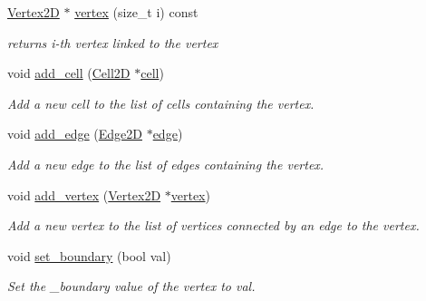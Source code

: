 \begin{DoxyCompactItemize}
\mbox{\label{classHCore2D_1_1Vertex2D_a2094c42a5fe6dc9fa3b91cb90746eeb9}} 
\hyperlink{classHCore2D_1_1Vertex2D}{Vertex2D} $\ast$ \hyperlink{classHCore2D_1_1Vertex2D_a2094c42a5fe6dc9fa3b91cb90746eeb9}{vertex} (size\+\_\+t i) const
\begin{DoxyCompactList}\small\item\em returns i-\/th vertex linked to the vertex \end{DoxyCompactList}\item 
\mbox{\label{classHCore2D_1_1Vertex2D_ae2b51139ae320115c0a732cb68dd5d91}} 
void \hyperlink{classHCore2D_1_1Vertex2D_ae2b51139ae320115c0a732cb68dd5d91}{add\+\_\+cell} (\hyperlink{classHCore2D_1_1Cell2D}{Cell2D} $\ast$\hyperlink{classHCore2D_1_1Vertex2D_ad5eb7914636eb9937f84370c6030aed9}{cell})
\begin{DoxyCompactList}\small\item\em Add a new cell to the list of cells containing the vertex. \end{DoxyCompactList}\item 
\mbox{\label{classHCore2D_1_1Vertex2D_a99d9e89fc5a01f960ca48179137dbd2f}} 
void \hyperlink{classHCore2D_1_1Vertex2D_a99d9e89fc5a01f960ca48179137dbd2f}{add\+\_\+edge} (\hyperlink{classHCore2D_1_1Edge2D}{Edge2D} $\ast$\hyperlink{classHCore2D_1_1Vertex2D_afebfae577ee499d5309ff6a3981279de}{edge})
\begin{DoxyCompactList}\small\item\em Add a new edge to the list of edges containing the vertex. \end{DoxyCompactList}\item 
\mbox{\label{classHCore2D_1_1Vertex2D_a44556af3aa22a09d2442fb87833085af}} 
void \hyperlink{classHCore2D_1_1Vertex2D_a44556af3aa22a09d2442fb87833085af}{add\+\_\+vertex} (\hyperlink{classHCore2D_1_1Vertex2D}{Vertex2D} $\ast$\hyperlink{classHCore2D_1_1Vertex2D_a2094c42a5fe6dc9fa3b91cb90746eeb9}{vertex})
\begin{DoxyCompactList}\small\item\em Add a new vertex to the list of vertices connected by an edge to the vertex. \end{DoxyCompactList}\item 
\mbox{\label{classHCore2D_1_1Vertex2D_a605706aa9e02bfc556a99c72eaf3e454}} 
void \hyperlink{classHCore2D_1_1Vertex2D_a605706aa9e02bfc556a99c72eaf3e454}{set\+\_\+boundary} (bool val)
\begin{DoxyCompactList}\small\item\em Set the \+\_\+boundary value of the vertex to val. \end{DoxyCompactList}\end{DoxyCompactItemize}


